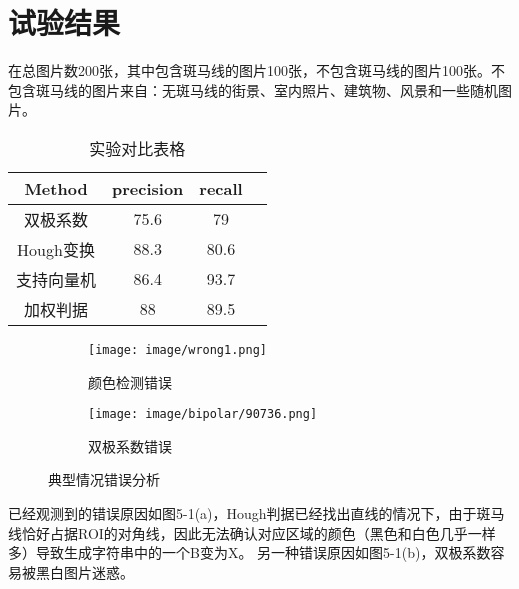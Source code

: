 
\chapter{试验结果}
在总图片数200张，其中包含斑马线的图片100张，不包含斑马线的图片100张。不包含斑马线的图片来自：无斑马线的街景、室内照片、建筑物、风景和一些随机图片。
\begin{table}[h] %
	\centering
		\begin{tabular}{*{4}{c}}
			\toprule
	 		Method & precision & recall \\
			\midrule
			双极系数 & 75.6 & 79 \\
		    Hough变换 & 88.3 & 80.6 \\
			支持向量机 & 86.4 & 93.7 \\
			加权判据 & 88 & 89.5 \\
			\bottomrule
		\end{tabular}
		\caption{实验对比表格}
\end{table}
\par
\begin{figure}[h]
    \centering
    \begin{subfigure}{.5\textwidth}
      \centering
      \texttt{[image: image/wrong1.png]}
      \caption{颜色检测错误}
    \end{subfigure}%
    \begin{subfigure}{.5\textwidth}
      \centering
      \texttt{[image: image/bipolar/90736.png]}
      \caption{双极系数错误}
    \end{subfigure}
    \caption{典型情况错误分析}
\end{figure}
\par
已经观测到的错误原因如图5-1(a)，Hough判据已经找出直线的情况下，由于斑马线恰好占据ROI的对角线，因此无法确认对应区域的颜色（黑色和白色几乎一样多）导致生成字符串中的一个B变为X。
另一种错误原因如图5-1(b)，双极系数容易被黑白图片迷惑。

